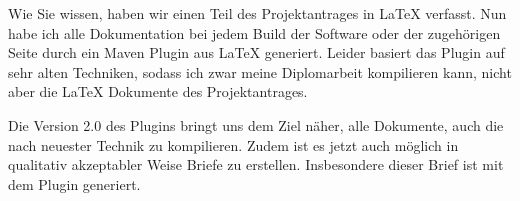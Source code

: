 \documentclass[german,a4paper,fontsize=10pt,version=last]{scrlttr2}%
\begin{document}
\newcommand{\AdressatFirma}{CapMini GmbH}
\newcommand{\AdressatTitel}{}
\newcommand{\AdressatVorname}{Egon}
\newcommand{\AdressatNachname}{Walther}
\newcommand{\AdressatAnschriftStrasse}{Walthershofener Straße 20}
\newcommand{\AdressatAnschriftPLZOrt}{88444 Walthershofen}

\begin{letter}{\Anschrift} 
  \opening{\Anrede}
  Wie Sie wissen, haben wir einen Teil des Projektantrages in \LaTeX{} verfasst. 
  Nun habe ich alle Dokumentation bei jedem \foreignlanguage{english}{Build} 
  der Software oder der zugehörigen Seite 
  durch ein \foreignlanguage{english}{Maven Plugin} aus \LaTeX{} generiert. 
  Leider basiert das \foreignlanguage{english}{Plugin} auf sehr alten Techniken, 
  sodass ich zwar meine Diplomarbeit kompilieren kann, 
  nicht aber die \LaTeX{} Dokumente des Projektantrages. 

  Die Version 2.0 des Plugins bringt uns dem Ziel näher, 
  alle Dokumente, auch die nach neuester Technik zu kompilieren. 
  Zudem ist es jetzt auch möglich in qualitativ akzeptabler Weise 
  Briefe zu erstellen. 
  Insbesondere dieser Brief ist mit dem Plugin generiert. 

  


  \closing{\Grussworte\\[2\baselineskip]}

\end{letter}
\end{document}

